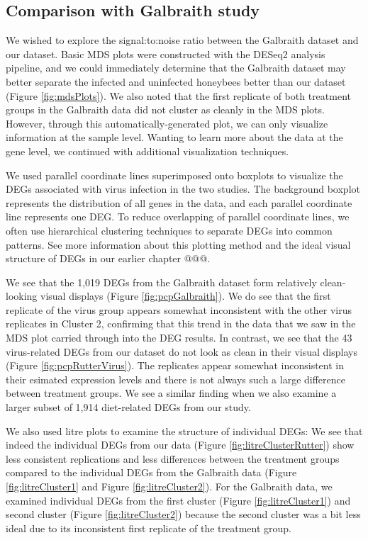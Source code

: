 \documentclass[11pt,a4paper,oldfontcommands,openany]{memoir}
\numberwithin{equation}{section} %
\begin{document}
\subsection{Comparison with Galbraith study}

We wished to explore the signal:to:noise ratio between the Galbraith dataset and our dataset. Basic MDS plots were constructed with the DESeq2 analysis pipeline, and we could immediately determine that the Galbraith dataset may better separate the infected and uninfected honeybees better than our dataset (Figure \ref{fig:mdsPlots}). We also noted that the first replicate of both treatment groups in the Galbraith data did not cluster as cleanly in the MDS plots. However, through this automatically-generated plot, we can only visualize information at the sample level. Wanting to learn more about the data at the gene level, we continued with additional visualization techniques.

We used parallel coordinate lines superimposed onto boxplots to visualize the DEGs associated with virus infection in the two studies. The background boxplot represents the distribution of all genes in the data, and each parallel coordinate line represents one DEG. To reduce overlapping of parallel coordinate lines, we often use hierarchical clustering techniques to separate DEGs into common patterns. See more information about this plotting method and the ideal visual structure of DEGs in our earlier chapter @@@.

We see that the 1,019 DEGs from the Galbraith dataset form relatively clean-looking visual displays (Figure \ref{fig:pcpGalbraith}). We do see that the first replicate of the virus group appears somewhat inconsistent with the other virus replicates in Cluster 2, confirming that this trend in the data that we saw in the MDS plot carried through into the DEG results. In contrast, we see that the 43 virus-related DEGs from our dataset do not look as clean in their visual displays (Figure \ref{fig:pcpRutterVirus}). The replicates appear somewhat inconsistent in their esimated expression levels and there is not always such a large difference between treatment groups. We see a similar finding when we also examine a larger subset of 1,914 diet-related DEGs from our study. 

We also used litre plots to examine the structure of individual DEGs: We see that indeed the individual DEGs from our data (Figure \ref{fig:litreClusterRutter}) show less consistent replications and less differences between the treatment groups compared to the individual DEGs from the Galbraith data (Figure \ref{fig:litreCluster1} and Figure \ref{fig:litreCluster2}). For the Galbraith data, we examined individual DEGs from the first cluster (Figure \ref{fig:litreCluster1}) and second cluster (Figure \ref{fig:litreCluster2}) because the second cluster was a bit less ideal due to its inconsistent first replicate of the treatment group.
\end{document}
